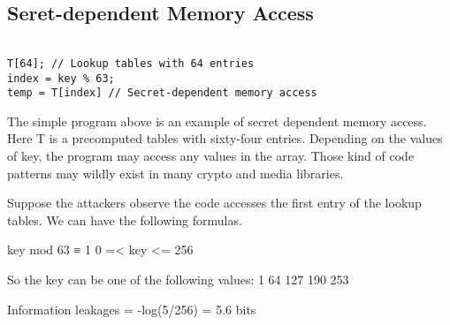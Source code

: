 \subsection{Seret-dependent Memory Access}

\begin{lstlisting}

T[64]; // Lookup tables with 64 entries
index = key % 63;
temp = T[index] // Secret-dependent memory access       

\end{lstlisting}

The simple program above is an example of secret dependent memory access. Here T is a precomputed tables with sixty-four entries. Depending on the values of key, the program may access any values in the array. Those kind of code patterns may wildly exist in many crypto and media libraries. 

Suppose the attackers observe the code accesses the first entry of the lookup tables. We can have the following formulas.

key mod 63 ≡ 1
0 =< key <= 256

So the key can be one of the following values:
1 64 127 190 253

Information leakages = -log(5/256) =  5.6 bits

